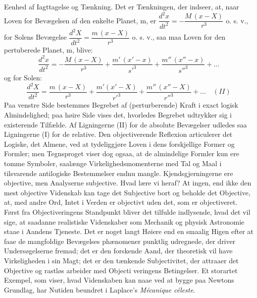 \documentclass[12pt,a4paper]{book}
\begin{document}
{Eenhed af Iagttagelse og Tænkning. Det er Tænkningen, der indseer,
at, naar Loven for Bevægelsen af den enkelte Planet, m, er
$\dfrac{d^{2}x}{dt^{2}} = - \dfrac{M\,(x - X)}{r^{3}}$ o. s. v., for
Solens Bevægelse
$\dfrac{d^{2}X}{dt^{2}} = \dfrac{m\,(x - X)}{r^{3}}$ o. s. v., saa
maa Loven for den pertuberede Planet, m, blive:
\[
\frac{d^{2}x}{dt^{2}} = - \frac{M\,(x - X)}{r^{3}}
  + \frac{m'\,(x' - x)}{{s'}^{3}}
  + \frac{m''\,(x'' - x)}{{s''}^{3}} + \ldots
\]
og for Solen:
\[
\frac{d^{2}X}{dt^{2}} = \frac{m\,(x - X)}{r^{3}}
  + \frac{m'(x' - X)}{{r'}^{3}}
  + \frac{m''\,(x'' - X)}{{r''}^{3}} + \ldots \quad (II)
\]
Paa venstre Side bestemmes Begrebet af (perturberende) Kraft i exact
logisk Almindelighed; paa høire Side vises det, hvorledes Begrebet
udtrykker sig i existerende Tilfælde. Af Ligningerne (II) for de
absolute Bevægelser udledes saa Ligningerne (I) for de relative. Den
objectiverende Reflexion articulerer det Logiske, det Almene, ved at
tydeliggjøre Loven i dens forskjellige Former og Formler; men
Tegnsproget viser dog ogsaa, at de almindelige Formler kun ere tomme
Symboler, saalænge Virkelighedsmomenterne med Tal og Maal i
tilsvarende antilogiske Bestemmelser endnu mangle.
Kjendsgjerningerne ere objective, men Analyserne subjective. Hvad
lære vi heraf? At ingen, end ikke den mest objective Videnskab kan
tage det Subjective bort og beholde det Objective, at, med andre
Ord, Intet i Verden er objectivt uden det, som er objectiveret.}
Først fra Objectiveringens Standpunkt
bliver det tilfulde indlysende, hvad det vil sige, at saadanne
realistiske Videnskaber som Mechanik og physisk Astronomie staae i
Aandens Tjeneste. Det er noget langt Høiere end en smaalig Higen
efter at faae de mangfoldige Bevægelses\-%
phænomener punktlig udregnede, der driver Undersøgelserne fremad;
det er den forskende Aand, der theoretisk vil have Virkeligheden i
sin Magt; det er den tænkende Subjectivitet, der attraaer det
Objective og rastløs arbeider med Objecti\-%
veringens Betingelser. Et storartet Exempel, som viser, hvad
Videnskaben kan naae ved at bygge paa Newtons Grundlag, har Nutiden
beundret i Laplace's \textit{Mécanique céleste}.
\end{document}
